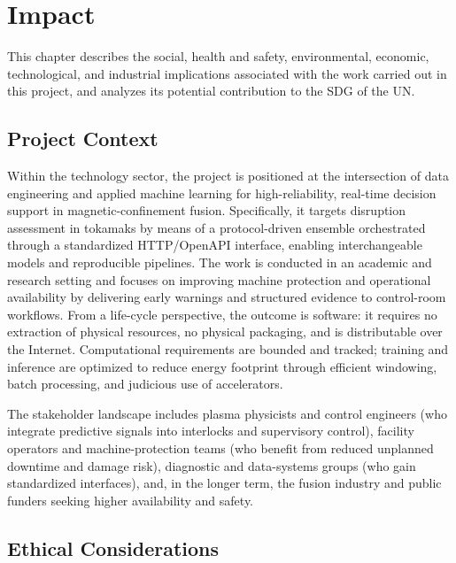 \chapter{Impact} \label{sec:cap6}

\noindent This chapter describes the social, health and safety, environmental, economic, technological, and industrial implications associated with the work carried out in this project, and analyzes its potential contribution to the \ac{SDG} of the \ac{UN}.

\section{Project Context}

Within the technology sector, the project is positioned at the intersection of data engineering and applied machine learning for high-reliability, real-time decision support in magnetic-confinement fusion. Specifically, it targets disruption assessment in tokamaks by means of a protocol-driven ensemble orchestrated through a standardized \ac{HTTP}/OpenAPI interface, enabling interchangeable models and reproducible pipelines. The work is conducted in an academic and research setting and focuses on improving machine protection and operational availability by delivering early warnings and structured evidence to control-room workflows. From a life-cycle perspective, the outcome is software: it requires no extraction of physical resources, no physical packaging, and is distributable over the Internet. Computational requirements are bounded and tracked; training and inference are optimized to reduce energy footprint through efficient windowing, batch processing, and judicious use of accelerators.

The stakeholder landscape includes plasma physicists and control engineers (who integrate predictive signals into interlocks and supervisory control), facility operators and machine-protection teams (who benefit from reduced unplanned downtime and damage risk), diagnostic and data-systems groups (who gain standardized interfaces), and, in the longer term, the fusion industry and public funders seeking higher availability and safety.

\section{Ethical Considerations}

